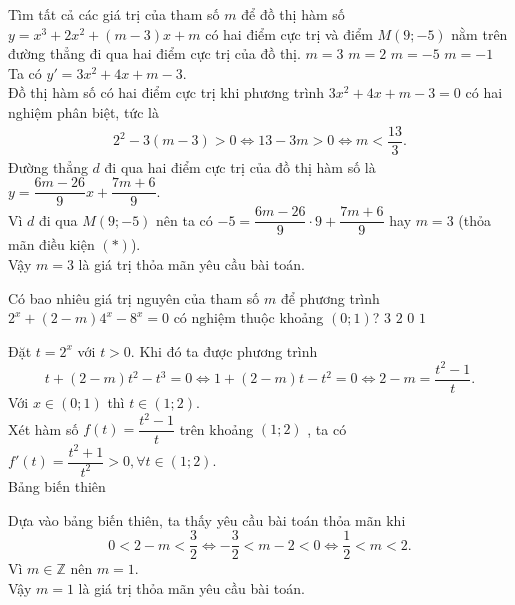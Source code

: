 \begin{ex}%
 Tìm tất cả các giá trị của tham số $m$ để đồ thị hàm số $y =x^3 +2x^2 + (m-3)x + m$ có hai điểm cực trị và điểm $M(9;-5)$ nằm trên đường thẳng đi qua hai điểm cực trị của đồ thị.
 \choice
  {\True $m=3$}
  {$m=2$}
  {$m=-5$}
  {$m=-1$}
 \loigiai
  {
  Ta có $y'=3x^2+4x+m-3$.\\
  Đồ thị hàm số có hai điểm cực trị khi phương trình $3x^2+4x+m-3=0$ có hai nghiệm phân biệt, tức là
  \begin{align*}
   2^2-3(m-3)>0 \Leftrightarrow 13-3m>0 \Leftrightarrow m<\dfrac{13}{3}. \tag{$*$}
  \end{align*}
  Đường thẳng $d$ đi qua hai điểm cực trị của đồ thị hàm số là $y = \dfrac{6m-26}{9}x+\dfrac{7m+6}{9}.$\\
  Vì $d$ đi qua $M(9;-5)$ nên ta có $-5=\dfrac{6m-26}{9}\cdot 9 +\dfrac{7m+6}{9}$ hay $m=3$ (thỏa mãn điều kiện $(*)$).\\
  Vậy $m = 3$ là giá trị thỏa mãn yêu cầu bài toán.
  }
\end{ex}


\begin{ex}%
 Có bao nhiêu giá trị nguyên của tham số $m$ để phương trình $2^x + (2-m)4^x - 8^x = 0$ có nghiệm thuộc khoảng $(0;1)$?
 \choice
  {$3$}
  {$2$}
  {$0$}
  {\True $1$}
 \loigiai
  {
  Đặt $t = 2^x$ với $t > 0$. Khi đó ta được phương trình
  $$t + (2-m)t^2 - t^3 = 0 \Leftrightarrow 1 + (2-m)t - t^2 = 0 \Leftrightarrow 2-m = \dfrac{t^2-1}{t}.$$
  Với $x \in (0;1)$ thì $t \in (1;2)$.\\
  Xét hàm số $f(t) = \dfrac{t^2-1}{t}$ trên khoảng $(1;2)$ , ta có $f'(t) = \dfrac{t^2+1}{t^2} > 0, \forall t \in (1;2)$.\\
  Bảng biến thiên
  \begin{center}
  \end{center}
  Dựa vào bảng biến thiên, ta thấy yêu cầu bài toán thỏa mãn khi $$0<2-m<\dfrac{3}{2} \Leftrightarrow -\dfrac{3}{2}<m-2<0 \Leftrightarrow \dfrac{1}{2}<m<2.$$
  Vì $m \in \mathbb{Z}$ nên $m = 1$.\\
  Vậy $m = 1$ là giá trị thỏa mãn yêu cầu bài toán.
  }
\end{ex}


